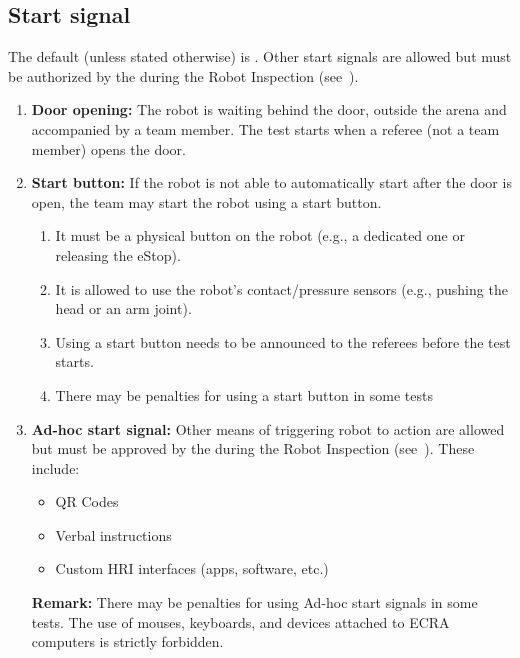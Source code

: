 \subsection{Start signal}
\label{rule:start_signal}
The default  (unless stated otherwise) is .
Other start signals are allowed but must be authorized by the  during the Robot Inspection (see~).

\begin{enumerate}
	\item \textbf{Door opening:} The robot is waiting behind the door, outside the arena and accompanied by a team member.
	The test starts when a referee (not a team member) opens the door.

	\item \textbf{Start button:} If the robot is not able to automatically start after the door is open, the team may start the robot using a start button.
	\begin{enumerate}[nosep]
		\item It must be a physical button on the robot (e.g., a dedicated one or releasing the eStop).
		\item It is allowed to use the robot's contact/pressure sensors (e.g., pushing the head or an arm joint).
		\item Using a start button needs to be announced to the referees before the test starts.
		\item There may be penalties for using a start button in some tests
	\end{enumerate}

	\item \textbf{Ad-hoc start signal:} Other means of triggering robot to action are allowed but must be approved by the  during the Robot Inspection (see~).
	These include:
	\begin{itemize}[nosep]
		\item QR Codes
		\item Verbal instructions
		\item Custom HRI interfaces (apps, software, etc.)
	\end{itemize}
	\textbf{Remark:} There may be penalties for using Ad-hoc start signals in some tests. The use of mouses, keyboards, and devices attached to ECRA computers is strictly forbidden.

\end{enumerate}


